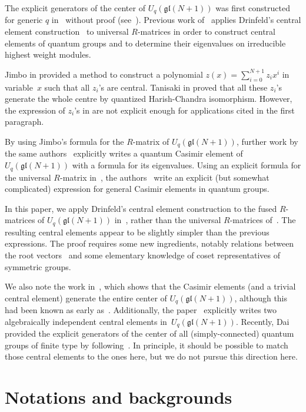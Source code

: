 \documentclass[pdftex]{sigma}
\numberwithin{equation}{section}
\newcommand{\Uqgl}{{U_q(\mathfrak{gl}(N+1))}}
\begin{document}
The explicit generators of the center of $\Uqgl$ was first constructed for generic $q$
in~\cite{FaddeevRT} without proof (see~\cite{Arnaudon:1993yg}). Previous work of~\cite{ZGBCMP} applies Drinfeld's central element construction~\cite{Drin90} to universal $R$-matrices in order to construct central elements of quantum groups and to determine their eigenvalues on irreducible highest weight modules.

Jimbo in \cite{Jimbo1986} provided a method to construct a polynomial $z(x) = \sum_{i=0}^{N+1} z_ix^i$ in variable~$x$ such that all $z_i$’s are central. Tanisaki in \cite{Tanisaki1992KILLINGFH} proved that all these $z_i$’s generate the whole centre by quantized Harish-Chandra isomorphism. However, the expression of $z_i$’s in \cite{Jimbo1986} are not explicit enough for applications cited in the first paragraph.

By using Jimbo's \cite{Jimbo1986} formula for the $R$-matrix of $\Uqgl$, further work by the same authors~\cite{GZB} explicitly writes a quantum Casimir element of $\Uqgl$ with a formula for its eigenvalues. Using an explicit formula for the universal $R$-matrix in~\cite{KirillovResh}, the authors~\cite{ZGBJPhysA} write an explicit (but somewhat complicated) expression for general Casimir elements in quantum groups.

In this paper, we apply Drinfeld's central element construction to the fused $R$-matrices of $\Uqgl$ in~\cite{Jimbo1986}, rather than the universal $R$-matrices of~\cite{KirillovResh}. The resulting central elements appear to be slightly simpler than the previous expressions. The proof requires some new ingredients, notably relations between the root vectors~\cite{KT91,Lusztig90,Xi1994} and some elementary knowledge of coset representatives of symmetric groups.

We also note the work in~\cite{Junbo}, which shows that the Casimir elements (and a trivial central element) generate the entire center of $\Uqgl$, although this had been known as early as~\cite{Rosso87}. Additionally, the paper~\cite{LXZ} explicitly writes two algebraically independent central elements in~$\Uqgl$. Recently, Dai~\cite{Dai} provided the explicit generators of the center of all (simply-connected) quantum groups of finite type by following~\cite{ZGBCMP}. In principle, it should be possible to match those central elements to the ones here, but we do not pursue this direction here.

\section{Notations and backgrounds}
\end{document}
